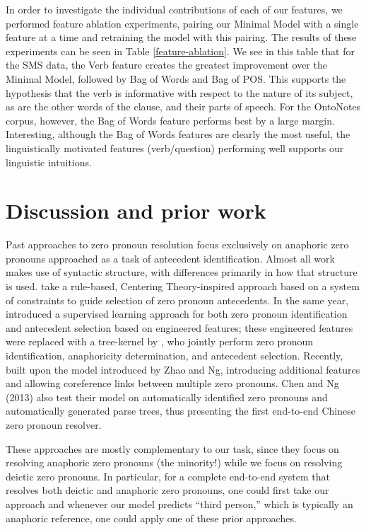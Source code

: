 \documentclass[11pt]{report}
\renewcommand\cite{\citep}	%
\begin{document}
In order to investigate the individual contributions of each of our features, we performed feature ablation experiments, pairing our Minimal Model with a single feature at a time and retraining the model with this pairing. The results of these experiments can be seen in Table \ref{feature-ablation}.
We see in this table that for the SMS data, the Verb feature creates the greatest improvement over the Minimal Model, followed by Bag of Words and Bag of POS. This supports the hypothesis that the verb is informative with respect to the nature of its subject, as are the other words of the clause, and their parts of speech. For the OntoNotes corpus, however, the Bag of Words feature performs best by a large margin. Interesting, although the Bag of Words features are clearly the most useful, the linguistically motivated features (verb/question) performing well supports our linguistic intuitions.

\section{Discussion and prior work}\label{related-work}

Past approaches to zero pronoun resolution focus exclusively on anaphoric zero pronouns approached as a task of antecedent identification. Almost all work makes use of syntactic structure, with differences primarily in how that structure is used. \cite{yeh2007zero} take a rule-based, Centering Theory-inspired approach based on a system of constraints to guide selection of zero pronoun antecedents. In the same year, \cite{zhao2007identification} introduced a supervised learning approach for both zero pronoun identification and antecedent selection based on engineered features; these engineered features were replaced with a tree-kernel by \cite{kong2010tree}, who jointly perform zero pronoun identification, anaphoricity determination, and antecedent selection. Recently, \cite{chen2013chinese} built upon the model introduced by Zhao and Ng, introducing additional features and allowing coreference links between multiple zero pronouns. Chen and Ng (2013) also test their model on automatically identified zero pronouns and automatically generated parse trees, thus presenting the first end-to-end Chinese zero pronoun resolver. 

These approaches are mostly complementary to our task, since they focus on resolving anaphoric zero pronouns (the minority!) while we focus on resolving deictic zero pronouns. In particular, for a complete end-to-end system that resolves both deictic and anaphoric zero pronouns, one could first take our approach and whenever our model predicts ``third person,'' which is typically an anaphoric reference, one could apply one of these prior approaches.
\end{document}
